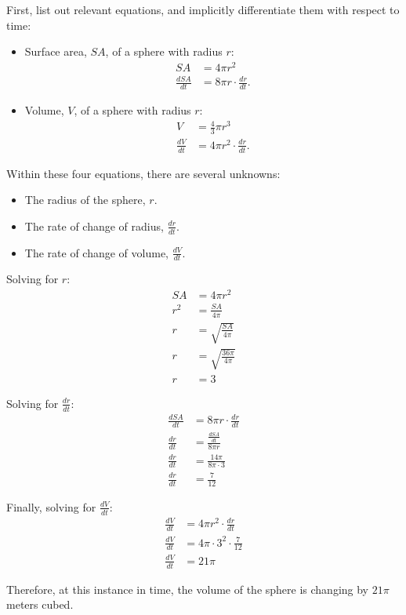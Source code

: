 \begin{enumerate}
	First, list out relevant equations, and implicitly differentiate them with respect to time:
	\begin{itemize}
		\item Surface area, $SA$, of a sphere with radius $r$:
		\begin{align*}
			SA &= 4 \pi r^2 \\
			\frac{dSA}{dt} &= 8 \pi r \cdot \frac{dr}{dt}.
		\end{align*}

		\item Volume, $V$, of a sphere with radius $r$:
		\begin{align*}
			V &= \frac{4}{3} \pi r^3 \\[5pt]
			\frac{dV}{dt} &= 4 \pi r^2 \cdot \frac{dr}{dt}.
		\end{align*}
	\end{itemize}

	Within these four equations, there are several unknowns:
	\begin{itemize}
		\item The radius of the sphere, $r$.
		\item The rate of change of radius, $\frac{dr}{dt}$.
		\item The rate of change of volume, $\frac{dV}{dt}$.
	\end{itemize}

	Solving for $r$:
	\begin{align*}
		SA &= 4 \pi r^2 \\
		r^2 &= \frac{SA}{4 \pi} \\[5pt]
		r &= \sqrt{\frac{SA}{4 \pi}} \\[5pt]
		r &= \sqrt{\frac{36 \pi}{4 \pi}} \\[5pt]
		r &= 3
	\end{align*}

	Solving for $\frac{dr}{dt}$:
	\begin{align*}
		\frac{dSA}{dt} &= 8 \pi r \cdot \frac{dr}{dt} \\[5pt]
		\frac{dr}{dt} &= \frac{\frac{dSA}{dt}}{8 \pi r} \\[5pt]
		\frac{dr}{dt} &= \frac{14 \pi}{8 \pi \cdot 3} \\[5pt]
		\frac{dr}{dt} &= \frac{7}{12}
	\end{align*}

	Finally, solving for $\frac{dV}{dt}$:
	\begin{align*}
		\frac{dV}{dt} &= 4 \pi r^2 \cdot \frac{dr}{dt} \\[5pt]
		\frac{dV}{dt} &= 4 \pi \cdot 3^2 \cdot \frac{7}{12} \\[5pt]
		\frac{dV}{dt} &= 21 \pi
	\end{align*}

	Therefore, at this instance in time, the volume of the sphere is changing by $21 \pi$ meters cubed.
\end{enumerate}

